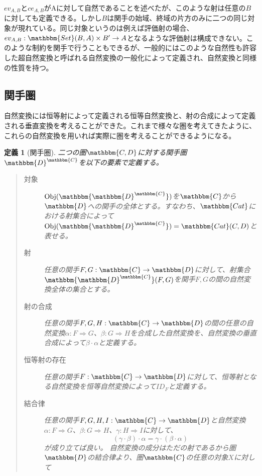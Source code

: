 \documentclass[uplatex,dvipdfmx]{jsarticle}
\newcommand{\cat}[1]{\mathbbm{#1}}
\newcommand{\arrow}{\rightarrow}
\newcommand{\functor}[3]{#1:\cat{#2}\arrow \cat{#3}}
\newcommand{\nat}[3]{#1:#2\Rightarrow #3}
\newcommand{\obj}[1]{\mathrm{Obj}(\cat{#1})}
\newcommand{\mor}[3]{#1:#2\arrow #3}
\newcommand{\arset}[3]{\cat{#1}(#2,#3)}
\newcommand{\funccat}[2]{\cat{#2}^\cat{#1}}
\newtheorem{define}{定義}[section]
\numberwithin{proof}{subsection}
\numberwithin{prop}{subsection}
\numberwithin{define}{subsection}
\begin{document}
  $ev_{A,B}$と$ce_{A,B}$がAに対して自然であることを述べたが、このような射は任意の$B$に対しても定義できる。しかし$B$は関手の始域、終域の片方のみに二つの同じ対象が現れている。同じ対象というのは例えば評価射の場合、$\mor{ev_{A,B}}{\arset{Set}{B}{A}\times B'}{A}$となるような評価射は構成できない。このような制約を関手で行うこともできるが、一般的にはこのような自然性も許容した超自然変換と呼ばれる自然変換の一般化によって定義され、自然変換と同様の性質を持つ。
	\subsection{関手圏}
	自然変換には恒等射によって定義される恒等自然変換と、射の合成によって定義される垂直変換を考えることができた。これまで様々な圏を考えてきたように、これらの自然変換を用いれば実際に圏を考えることができるようになる。
	\begin{define}[関手圏]
		二つの圏$\cat{C,D}$に対する関手圏$\funccat{C}{D}$を以下の要素で定義する。
		\begin{quote}
			\begin{description}
				\item[対象] $\obj{\funccat{C}{D}}$を$\cat{C}$から$\cat{D}$への関手の全体とする。すなわち、$\cat{Cat}$における射集合によって$\obj{\funccat{C}{D}}=\arset{Cat}{C}{D}$と表せる。
				\item[射]任意の関手$\functor{F,G}{C}{D}$に対して、射集合$\arset{\funccat{C}{D}}{F}{G}$を関手$F,G$の間の自然変換全体の集合とする。
				\item[射の合成] 任意の関手$\functor{F,G,H}{C}{D}$の間の任意の自然変換$\nat{\alpha}{F}{G}$、$\nat{\beta}{G}{H}$を合成した自然変換を、自然変換の垂直合成によって$\beta\cdot\alpha$と定義する。
				\item[恒等射の存在]任意の関手$\functor{F}{C}{D}$に対して、恒等射となる自然変換を恒等自然変換によって$ID_F$と定義する。
				\item[結合律]任意の関手$\functor{F,G,H,I}{C}{D}$と自然変換$\nat{\alpha}{F}{G}$、$\nat{\beta}{G}{H}$、$\nat{\gamma}{H}{I}$に対して、\[(\gamma\cdot\beta)\cdot\alpha=\gamma\cdot(\beta\cdot\alpha)\]が成り立てば良い。
				自然変換の成分はただの射であるから圏$\cat{D}$の結合律より、圏$\cat{C}$の任意の対象$X$に対して


\end{description}
\end{quote}
\end{define}
\end{document}

